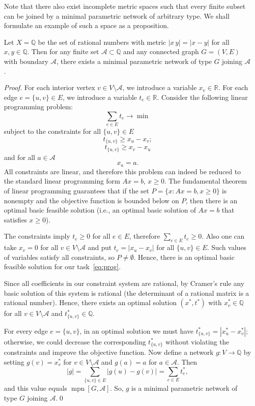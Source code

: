 \documentclass{svproc}
\def\mpn{\operatorname{mpn}}
\begin{document}
Note that there also exist incomplete metric spaces such that every finite subset can be joined by a minimal parametric network of arbitrary type. We shall formulate an example of such a space as a proposition.

\begin{proposition}\label{prop:noncomplete}
Let $X = \mathbb{Q}$ be the set of rational numbers with metric $|x\, y| = |x - y|$ for all $x, y\in \mathbb{Q}$. Then for any finite set $\mathcal{A}\subset \mathbb{Q}$ and any connected graph $G=(V, E)$ with boundary $\mathcal{A}$, there exists a minimal parametric network of type $G$ joining $\mathcal{A}$.
\end{proposition}

\begin{proof}

For each interior vertex $v\in V\setminus \mathcal{A}$, we introduce a variable $x_v\in \mathbb{R}$. For each edge $e = \{u, v\}\in E$, we introduce a variable $t_e\in \mathbb{R}$. Consider the following linear programming problem:
\begin{equation}\label{eq:prog}
\sum\limits_{e\in E} t_e \rightarrow \min
\end{equation}
subject to the constraints for all $\{u, v\}\in E$
$$t_{\{u, v\}}\ge x_u - x_v;$$
$$t_{\{u, v\}}\ge x_v - x_u$$
and for all $a\in \mathcal{A}$
$$x_a = a.$$
All constraints are linear, and therefore this problem can indeed be reduced to the standard linear programming form $Ax = b$, $x\ge 0$. The fundamental theorem of linear programming guarantees that if the set $P = \{x\colon Ax = b, x\ge 0\}$ is nonempty and the objective function is bounded below on $P$, then there is an optimal basic feasible solution (i.e., an optimal basic solution of $Ax = b$ that satisfies $x\ge 0$). 

The constraints imply $t_e\ge 0$ for all $e\in E$, therefore $\sum_{e\in E} t_e\ge 0$. Also one can take $x_v = 0$ for all $v\in V\setminus \mathcal{A}$ and put $t_e = |x_u - x_v|$ for all $\{u, v\}\in E$. Such values of variables satisfy all constraints, so $P\neq \emptyset$. Hence, there is an optimal basic feasible solution for our task~\eqref{eq:prog}.

Since all coefficients in our constraint system are rational, by Cramer's rule any basic solution of this system is rational (the determinant of a rational matrix is a rational number). Hence, there exists an optimal solution $(x^*, t^*)$ with $x_v^* \in \mathbb{Q}$ for all $v\in V\setminus \mathcal{A}$ and $t_{\{u, v\}}^* \in \mathbb{Q}$.

For every edge $e = \{u, v\}$, in an optimal solution we must have $t_{\{u, v\}}^* = |x_u^* - x_v^*|$; otherwise, we could decrease the corresponding $t_{\{u, v\}}^*$ without violating the constraints and improve the objective function. Now define a network $g\colon V\to \mathbb{Q}$ by setting $g(v) = x_v^*$ for $v\in V\setminus \mathcal{A}$ and $g(a)=a$ for $a\in \mathcal{A}$. Then
$$
|g| = \sum_{\{u, v\}\in E} |g(u) - g(v)| = \sum_{e\in E} t_e^*,
$$
and this value equals $\mpn[G, \mathcal{A}]$. So, $g$ is a minimal parametric network of type $G$ joining $\mathcal{A}$.\qed

\end{proof}
\end{document}
